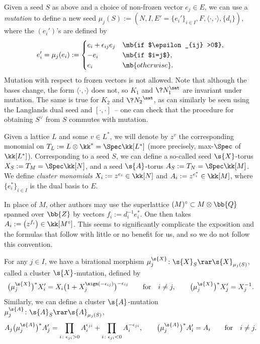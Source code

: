 Given a seed $S$ as above and a choice of non-frozen vector $e_j\in E$, we can use a {\it mutation} to define a new seed $\mu_j(S):=(N,I,E'=\{e_i'\}_{i\in I},F,\langle\cdot,\cdot\rangle,\{d_i\})$, where the $(e_i')$'s are defined by
\begin{gather}\label{seedmut}
 e'_{i} = \mu_{j}(e_{i}): = \begin{cases}
 e_{i}+\epsilon_{ij}e_{j} &\mb{if $\epsilon_{ij} >0$}, \\
 -e_{i} &\mb{if $i=j$}, \\
	e_{i} &\mb{otherwise}.
	\end{cases}
\end{gather}
Mutation with respect to frozen vectors is not allowed. Note that although the bases change, the form $\langle \cdot,\cdot\rangle$ does not, so $K_1$ and $\?{N}_1^{\sat}$ are invariant under mutation. The same is true for $K_2$ and $\?{N_2}^{\sat}$, as can similarly be seen using the Langlands dual seed and $[\cdot,\cdot]$~-- one can check that the procedure for obtaining $S^{\vee}$ from $S$ commutes with mutation.

Given a lattice $L$ and some $v\in L^*$, we will denote by $z^v$ the corresponding monomial on $T_L:=L\otimes \kk^*=\Spec \kk[L^*]$ (more precisely, max-$\Spec$ of $\kk[L^*]$). Corresponding to a seed $S$, we can define a so-called seed $\s{X}$-torus $X_S:=T_{M}=\Spec \kk[N]$, and a seed $\s{A}$-torus $A_S:=T_{N}=\Spec \kk[M]$.
 We define {\it cluster monomials} $X_i:=z^{e_i}\in \kk[N]$ and $A_i:=z^{e_i^*}\in \kk[M]$, where $\{ e_i^*\}_{i\in I}$ is the dual basis to $E$.

\begin{rmk}\label{convention-departure}In place of $M$, other authors may use the superlattice $(M)^{\circ}\subset M\otimes \bb{Q}$ spanned over $\bb{Z}$ by vectors $f_i:=d_i^{-1}e_i^*$. One then takes $A_i:=\big(z^{f_i}\big) \in \kk[M^{\circ}]$. This seems to significantly complicate the exposition and the formulas that follow with little or no benefit for us, and so we do not follow this convention.
\end{rmk}

For any $j\in I$, we have a birational morphism $\mu_j^{\s{X}}\colon \s{X}_S\rar \s{X}_{\mu_j(S)}$, called a cluster $\s{X}$-mutation, defined by
\begin{gather*}
	\big(\mu_j^{\s{X}}\big)^* X_i' = 	X_i\big(1+X_j^{\sign(-\epsilon_{ij})}\big)^{-\epsilon_{ij}} \qquad \text{for} \quad i\neq j, \qquad \big(\mu_j^{\s{X}}\big)^* X_j' = X_j^{-1} .
\end{gather*}
Similarly, we can define a cluster $\s{A}$-mutation $\mu_j^{\s{A}}\colon \s{A}_S\rar \s{A}_{\mu_j(S)}$,
\begin{gather*}
	A_{j}\big(\mu_j^{\s{A}}\big)^* A_{j}' =\prod_{i\colon \epsilon_{ji}>0} A_{i}^{\epsilon_{ji}} + \prod_{i\colon \epsilon_{ji}<0} A_{i}^{-\epsilon_{ji}},\qquad \big(\mu_j^{\s{A}}\big)^*	A_{i}'=A_{i} \qquad \text{for} \quad i\neq j.
\end{gather*}

